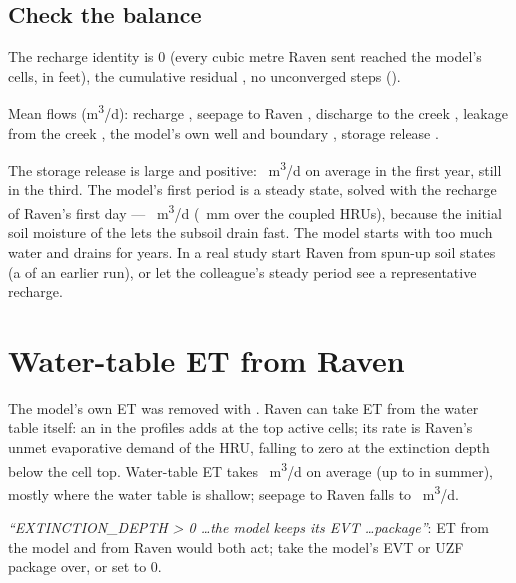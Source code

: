\subsection{Check the balance}
\begin{tocheck}
The recharge identity is 0 (every cubic metre Raven sent reached the model's cells, in feet), the cumulative residual
, no unconverged steps ().
\end{tocheck}
Mean flows (m\textsuperscript{3}/d): recharge , seepage to Raven , discharge to the creek
, leakage from the creek , the model's own well and boundary , storage release
.
\begin{note}
The storage release is large and positive: ~m\textsuperscript{3}/d on average in the first year, still
 in the third. The model's first period is a steady state, solved with the recharge of Raven's first day ---
~m\textsuperscript{3}/d (~mm over the coupled HRUs), because the initial soil moisture
of the  lets the subsoil drain fast. The model starts with too much water and drains for years. In a real
study start Raven from spun-up soil states (a  of an earlier run), or let the colleague's steady period
see a representative recharge.
\end{note}

\section{Water-table ET from Raven}
The model's own ET was removed with . Raven can take ET from the water table itself: an
 in the profiles adds  at the top active cells; its rate is Raven's unmet
evaporative demand of the HRU, falling to zero at the extinction depth below the cell top.
Water-table ET takes ~m\textsuperscript{3}/d on average (up to  in summer), mostly where the
water table is shallow; seepage to Raven falls to ~m\textsuperscript{3}/d.
\begin{trouble}
\emph{``EXTINCTION\_DEPTH > 0 \dots the model keeps its EVT \dots package''}: ET from the model and from Raven would both act;
take the model's EVT or UZF package over, or set  to 0.
\end{trouble}

